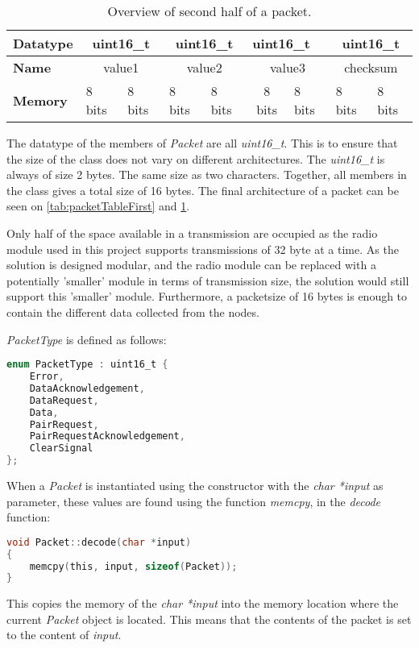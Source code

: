 \begin{table}[]
\centering
\begin{tabular}{|l|c|l|c|l|c|l|c|l|}
\hline
\textbf{Datatype} & \multicolumn{2}{c|}{uint16\_t}       & \multicolumn{2}{c|}{uint16\_t}       & \multicolumn{2}{l|}{uint16\_t} & \multicolumn{2}{c|}{uint16\_t}       \\ \hline
\textbf{Name}     & \multicolumn{2}{c|}{value1}         & \multicolumn{2}{c|}{value2}         & \multicolumn{2}{c|}{value3}   & \multicolumn{2}{c|}{checksum}        \\ \hline
\textbf{Memory}   & \multicolumn{1}{l|}{8 bits} & 8 bits & \multicolumn{1}{l|}{8 bits} & 8 bits & 8 bits         & 8 bits        & \multicolumn{1}{l|}{8 bits} & 8 bits \\ \hline
\end{tabular}
\caption{Overview of second half of a packet.}
\label{tab:packetTableSecond}
\end{table}

The datatype of the members of \textit{Packet} are all \textit{uint16\_t}. This is to ensure that the size of the class does not vary on different architectures. The \textit{uint16\_t} is always of size 2 bytes. The same size as two characters. Together, all members in the class gives a total size of 16 bytes. The final architecture of a packet can be seen on \ref{tab:packetTableFirst} and \ref{tab:packetTableSecond}.

Only half of the space available in a transmission are occupied as the radio module used in this project supports transmissions of 32 byte at a time. As the solution is designed modular, and the radio module can be replaced with a potentially 'smaller' module in terms of transmission size, the solution would still support this 'smaller' module. Furthermore, a packetsize of 16 bytes is enough to contain the different data collected from the nodes.

\textit{PacketType} is defined as follows:
\begin{lstlisting}[language=C]
enum PacketType : uint16_t {
    Error,
    DataAcknowledgement,
    DataRequest,
    Data,
    PairRequest,
    PairRequestAcknowledgement,
    ClearSignal
};
\end{lstlisting}


When a \textit{Packet} is instantiated using the constructor with the \textit{char *input} as parameter, these values are found using the function \textit{memcpy}, in the \textit{decode} function:
\begin{lstlisting}[language=C]
void Packet::decode(char *input)
{
    memcpy(this, input, sizeof(Packet));
}
\end{lstlisting}
This copies the memory of the \textit{char *input} into the memory location where the current \textit{Packet} object is located. This means that the contents of the packet is set to the content of \textit{input}.

